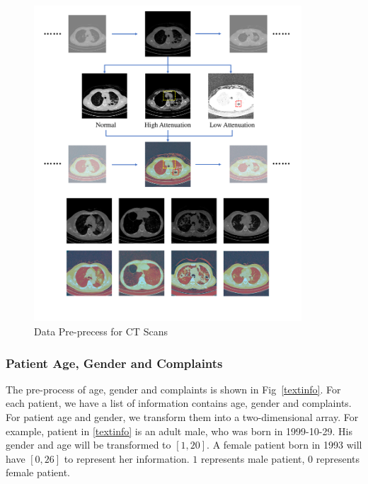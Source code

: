 \documentclass[runningheads]{llncs}
\begin{document}
\begin{figure}[!t]
    \centerline{\includegraphics[width=100mm]{3channel.pdf}}
    \vspace{-1cm}
    \caption{Data Pre-precess for CT Scans}
    \vspace{-0cm}
    \label{3channel}
    \end{figure}

\subsubsection{Patient Age, Gender and Complaints}
\label{textdata}
The pre-process of age, gender and complaints is shown in Fig~\ref{textinfo}. For each patient, we have a list of information contains age, gender and complaints. 
For patient age and gender, we transform them into a two-dimensional array. For example, patient in \ref{textinfo} is an adult male, who was born in 1999-10-29. His gender and age will be transformed to $[1, 20]$. A female patient born in 1993 will have $[0, 26]$ to represent her information. $1$ represents male patient, $0$ represents female patient.
\end{document}
